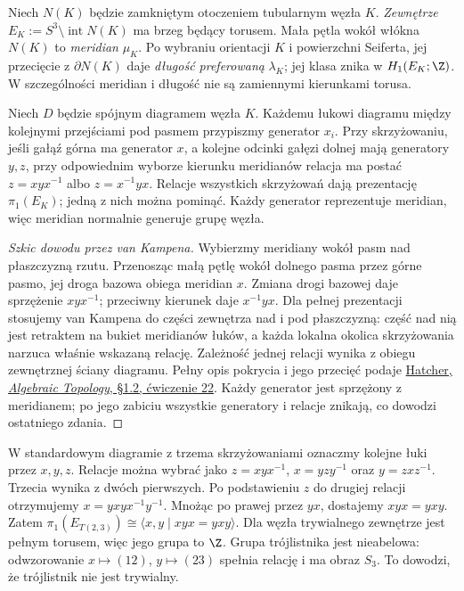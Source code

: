 Niech $N(K)$ będzie zamkniętym otoczeniem tubularnym
węzła $K$. \emph{Zewnętrze} $E_K:=S^3\setminus
\operatorname{int}N(K)$ ma brzeg będący torusem.
Mała pętla wokół włókna $N(K)$ to \emph{meridian}
$\mu_K$. Po wybraniu orientacji $K$ i powierzchni
Seiferta, jej przecięcie z $\partial N(K)$ daje
\emph{długość preferowaną} $\lambda_K$; jej klasa
znika w $H_1(E_K;\Z)$. W szczególności meridian
i długość nie są zamiennymi kierunkami torusa.

\begin{twierdzenie}
\label{thm:wirtinger-20}
Niech $D$ będzie spójnym diagramem węzła $K$.
Każdemu łukowi diagramu między kolejnymi przejściami
pod pasmem przypiszmy generator $x_i$. Przy skrzyżowaniu,
jeśli gałąź górna ma generator $x$, a kolejne odcinki
gałęzi dolnej mają generatory $y,z$, przy odpowiednim
wyborze kierunku meridianów relacja ma postać
$z=xyx^{-1}$ albo $z=x^{-1}yx$.
Relacje wszystkich skrzyżowań dają prezentację
$\pi_1(E_K)$; jedną z nich można pominąć.
Każdy generator reprezentuje meridian, więc
meridian normalnie generuje grupę węzła.
\end{twierdzenie}
\begin{proof}[Szkic dowodu przez van Kampena]
Wybierzmy meridiany wokół pasm nad płaszczyzną rzutu.
Przenosząc małą pętlę wokół dolnego pasma przez
górne pasmo, jej droga bazowa obiega meridian $x$.
Zmiana drogi bazowej daje sprzężenie $xyx^{-1}$;
przeciwny kierunek daje $x^{-1}yx$. Dla pełnej
prezentacji stosujemy van Kampena do części zewnętrza
nad i pod płaszczyzną: część nad nią jest retraktem
na bukiet meridianów łuków, a każda lokalna okolica
skrzyżowania narzuca właśnie wskazaną relację.
Zależność jednej relacji wynika z obiegu zewnętrznej
ściany diagramu. Pełny opis pokrycia i jego przecięć
podaje \href{https://pi.math.cornell.edu/~hatcher/AT/ATch1.pdf}
{Hatcher, \emph{Algebraic Topology}, §1.2, ćwiczenie 22}.
Każdy generator jest sprzężony z meridianem;
po jego zabiciu wszystkie generatory i relacje znikają,
co dowodzi ostatniego zdania.
\end{proof}

\begin{przyklad}[Trójlistnik]
W standardowym diagramie z trzema skrzyżowaniami
oznaczmy kolejne łuki przez $x,y,z$. Relacje można
wybrać jako $z=xyx^{-1}$, $x=yzy^{-1}$ oraz
$y=zxz^{-1}$. Trzecia wynika z dwóch pierwszych.
Po podstawieniu $z$ do drugiej relacji otrzymujemy
$x=yxyx^{-1}y^{-1}$. Mnożąc po prawej przez
$yx$, dostajemy $xyx=yxy$. Zatem
$\pi_1(E_{T(2,3)})\cong\langle x,y\mid xyx=yxy\rangle$.
Dla węzła trywialnego zewnętrze jest pełnym torusem,
więc jego grupa to $\Z$. Grupa trójlistnika jest
nieabelowa: odwzorowanie $x\mapsto(12)$,
$y\mapsto(23)$ spełnia relację i ma obraz $S_3$.
To dowodzi, że trójlistnik nie jest trywialny.
\end{przyklad}

